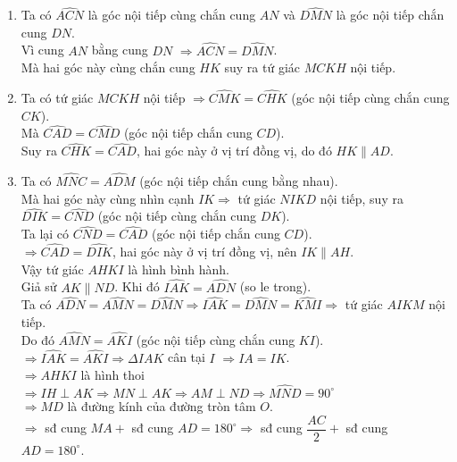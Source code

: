 \begin{ex}
{\begin{center}
\end{center}
\begin{enumerate}
\item Ta có $\widehat{ACN}$  là góc nội tiếp cùng chắn cung $AN$ và $\widehat{DMN}$ là góc nội tiếp chắn cung $DN$.\\ 
Vì cung $AN$ bằng cung $DN$ $\Rightarrow \widehat{ACN}=\widehat{DMN}$. \\
Mà hai góc này cùng chắn cung $HK$ suy ra tứ giác $MCKH$ nội tiếp.
\item Ta có tứ giác $MCKH$ nội tiếp $\Rightarrow \widehat{CMK}=\widehat{CHK}$ (góc nội tiếp cùng chắn cung $CK$).\\
Mà $\widehat{CAD}=\widehat{CMD}$ (góc nội tiếp chắn cung $CD$).\\
Suy ra $\widehat{CHK}=\widehat{CAD}$, hai góc này ở vị trí đồng vị, do đó $HK \parallel AD$.
\item Ta có $\widehat{MNC}=\widehat{ADM}$ (góc nội tiếp chắn cung bằng nhau).\\
Mà hai góc này cùng nhìn cạnh $IK \Rightarrow $ tứ giác $NIKD$ nội tiếp, suy ra $\widehat{DIK}=\widehat{CND}$ (góc nội tiếp cùng chắn cung $DK$).\\
Ta lại có $\widehat{CND}=\widehat{CAD}$ (góc nội tiếp chắn cung $CD$).\\
$\Rightarrow \widehat{CAD}=\widehat{DIK}$, hai góc này ở vị trí đồng vị, nên $IK \parallel AH$.\\
Vậy tứ giác $AHKI$ là hình bình hành.\\
Giả sử $AK \parallel ND$. Khi đó $\widehat{IAK}=\widehat{ADN}$ (so le trong).\\
Ta có  $\widehat{ADN}=\widehat{AMN}=\widehat{DMN} \Rightarrow \widehat{IAK}=\widehat{DMN}=\widehat{KMI} \Rightarrow$ tứ giác $AIKM$ nội tiếp.\\
Do đó $\widehat{AMN}=\widehat{AKI}$ (góc nội tiếp cùng chắn cung $KI$).\\
$\Rightarrow \widehat{IAK}=\widehat{AKI} \Rightarrow \Delta IAK$ cân tại $I$ $\Rightarrow IA=IK$.\\
$\Rightarrow AHKI$ là hình thoi $\Rightarrow IH \perp AK \Rightarrow MN \perp AK \Rightarrow AM \perp ND \Rightarrow \widehat{MND}=90^{\circ}$ \\
$ \Rightarrow MD $ là đường kính của đường tròn tâm $O$.\\
$\Rightarrow$ sđ cung $MA+$ sđ cung $AD=180^{\circ} \Rightarrow $ sđ cung $\dfrac{AC}{2}+$ sđ cung $AD=180^{\circ}$.
\end{enumerate}
}
\end{ex}

